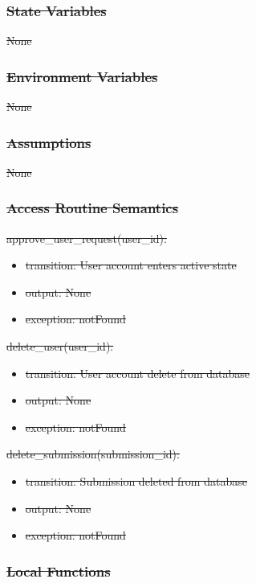 \documentclass[12pt, titlepage]{article}
\begin{document}
\subsubsection{\sout{State Variables}}

\sout{None}

\subsubsection{\sout{Environment Variables}}

\sout{None}

\subsubsection{\sout{Assumptions}}

\sout{None}

\subsubsection{\sout{Access Routine Semantics}}

\noindent \sout{approve\_user\_request(user\_id):}
\begin{itemize}
\item \sout{transition: User account enters active state}
\item \sout{output: None}
\item \sout{exception: notFound}
\end{itemize}

\noindent \sout{delete\_user(user\_id):}
\begin{itemize}
\item \sout{transition: User account delete from database}
\item \sout{output: None}
\item \sout{exception: notFound}
\end{itemize}

\noindent \sout{delete\_submission(submission\_id):}
\begin{itemize}
\item \sout{transition: Submission deleted from database}
\item \sout{output: None}
\item \sout{exception: notFound}
\end{itemize}

\subsubsection{\sout{Local Functions}}
\end{document}

